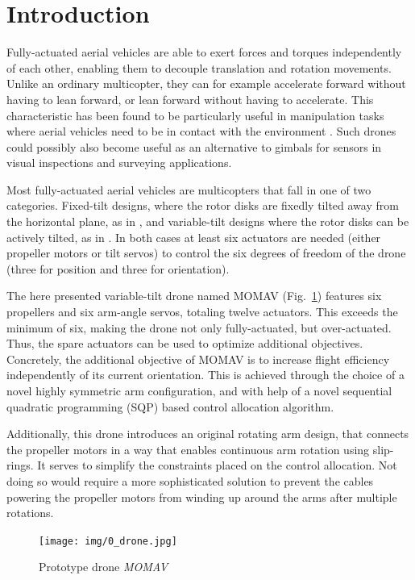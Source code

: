 \documentclass[conference]{IEEEtran}
\begin{document}
\section{Introduction}
Fully-actuated aerial vehicles are able to exert forces and torques independently of each other, enabling them to decouple translation and rotation movements. Unlike an ordinary multicopter, they can for example accelerate forward without having to lean forward, or lean forward without having to accelerate. This characteristic has been found to be particularly useful in manipulation tasks where aerial vehicles need to be in contact with the environment \cite{2021_ollero_manipulators, 2020_rashad_fullyactuated_review}. Such drones could possibly also become useful as an alternative to gimbals for sensors in visual inspections and surveying applications.
\par
Most fully-actuated aerial vehicles are multicopters that fall in one of two categories. Fixed-tilt designs, where the rotor disks are fixedly tilted away from the horizontal plane, as in \cite{2023_howard_lynchpin, 2016_brescianini_octcu, 2018_park_odar, 2020_hamadi_o7plus, 2022_flores_tiltedhex, 2021_ma_ams, 2019_rashad_hamiltonian_control, 2018_tognon_heptw, 2017_florentin_quad4hor, 2017_lei_cohexcd, 2013_jiang_hexc, 2012_toratani_hexdtet, 2015_nikou_heptf}, and variable-tilt designs where the rotor disks can be actively tilted, as in \cite{2019_bodie_omav, 2018_kamel_voliro, 2023_cuniatro_voliro2, 2021_buzzatto_unicopter, 2020_xu_bicopter, 2020_lee_t3multirotor, 2020_zheng_tiltdrone, 2016_ryll_fasthex, 2016_odelga_quadvcdc, 2015_kastelan_tricopter, 2015_moutinho_tiltquadrotor, 2015_ryll_quadvc, 2013_sequigasco_quadvcd, 2018_junaid_dualtiltquad}. In both cases at least six actuators are needed (either propeller motors or tilt servos) to control the six degrees of freedom of the drone (three for position and three for orientation).
\par
The here presented variable-tilt drone named MOMAV \mbox{(Fig. \ref{fig:0_drone})} features six propellers and six arm-angle servos, totaling twelve actuators. This exceeds the minimum of six, making the drone not only fully-actuated, but over-actuated. Thus, the spare actuators can be used to optimize additional objectives. Concretely, the additional objective of MOMAV is to increase flight efficiency independently of its current orientation. This is achieved through the choice of a novel highly symmetric arm configuration, and with help of a novel sequential quadratic programming (SQP) based control allocation algorithm.
\par
Additionally, this drone introduces an original rotating arm design, that connects the propeller motors in a way that enables continuous arm rotation using slip-rings. It serves to simplify the constraints placed on the control allocation. Not doing so would require a more sophisticated solution to prevent the cables powering the propeller motors from winding up around the arms after multiple rotations.
\begin{figure}[t!]
	\texttt{[image: img/0\_drone.jpg]}
	\caption{Prototype drone \textit{MOMAV}}
	\label{fig:0_drone}
	\vspace{-6pt}
\end{figure}
\end{document}
